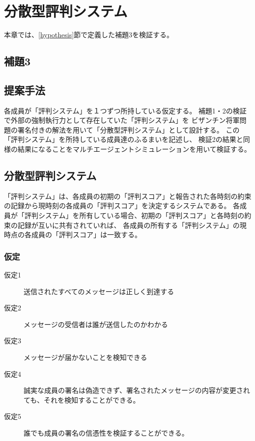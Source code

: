 \chapter{分散型評判システム}
本章では、\ref{hypothesis}節で定義した補題3を検証する。

\section{補題3}
\thirdLemma

\section{提案手法}
各成員が「評判システム」を１つずつ所持している仮定する。
補題1・2の検証で外部の強制執行力として存在していた「評判システム」を
ビザンチン将軍問題の署名付きの解法を用いて「分散型評判システム」として設計する。
この「評判システム」を所持している成員達のふるまいを記述し、
検証2の結果と同様の結果になることをマルチエージェントシミュレーションを用いて検証する。

\section{分散型評判システム}
「評判システム」は、各成員の初期の「評判スコア」と報告された各時刻の約束の記録から現時刻の各成員の「評判スコア」を決定するシステムである。
各成員が「評判システム」を所有している場合、初期の「評判スコア」と各時刻の約束の記録が互いに共有されていれば、
各成員の所有する「評判システム」の現時点の各成員の「評判スコア」は一致する。

\subsection{仮定}
\begin{description}
  \item[仮定1] 送信されたすべてのメッセージは正しく到達する
  \item[仮定2] メッセージの受信者は誰が送信したのかわかる
  \item[仮定3] メッセージが届かないことを検知できる
  \item[仮定4] 誠実な成員の署名は偽造できず、署名されたメッセージの内容が変更されても、それを検知することができる。
  \item[仮定5] 誰でも成員の署名の信憑性を検証することができる。
\end{description}

